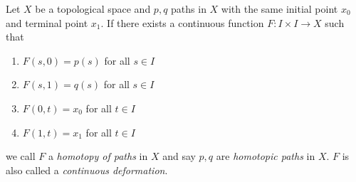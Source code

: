 \documentclass[12pt]{article}
\begin{document}
Let $X$ be a topological space and $p,q$ paths in $X$ with the same initial point $x_{0}$ and terminal point $x_{1}$. If there exists a continuous function $F: I \times I \to X$ such that
\begin{enumerate}
\item $F(s,0)=p(s)$ for all $s \in I$
\item $F(s,1)=q(s)$ for all $s \in I$
\item $F(0,t)=x_{0}$ for all $t \in I$
\item $F(1,t)=x_{1}$ for all $t \in I$
\end{enumerate}

we call $F$ a \emph{homotopy of paths} in $X$ and say $p,q$ are \emph{homotopic paths} in $X$. $F$ is also called a \emph{continuous deformation}.
\end{document}
